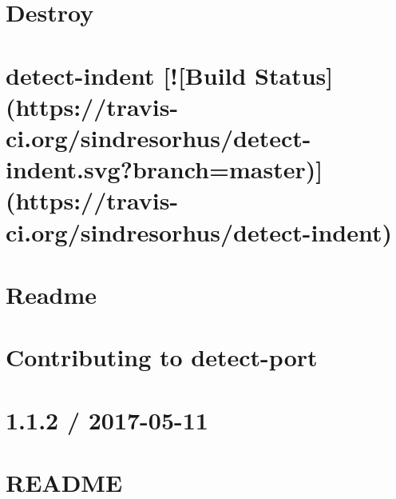 \documentclass[twoside]{book}
\newcommand{\+}{\discretionary{\mbox{\scriptsize$\hookleftarrow$}}{}{}}
\begin{document}
\chapter{Destroy}
\label{md__c_1_workspace_demo_src_main_script_node_modules_destroy__r_e_a_d_m_e}

\chapter{detect-\/indent \mbox{[}!\mbox{[}Build Status\mbox{]}(https\+://travis-\/ci.org/sindresorhus/detect-\/indent.svg?branch=master)\mbox{]}(https\+://travis-\/ci.org/sindresorhus/detect-\/indent)}
\label{md__c_1_workspace_demo_src_main_script_node_modules_detect-indent_readme}

\chapter{Readme}
\label{md__c_1_workspace_demo_src_main_script_node_modules_detect-node__readme}

\chapter{Contributing to detect-\/port}
\label{md__c_1_workspace_demo_src_main_script_node_modules_detect-port-alt__c_o_n_t_r_i_b_u_t_i_n_g}

\chapter{1.1.2 / 2017-\/05-\/11}
\label{md__c_1_workspace_demo_src_main_script_node_modules_detect-port-alt__h_i_s_t_o_r_y}

\chapter{R\+E\+A\+D\+ME}
\label{md__c_1_workspace_demo_src_main_script_node_modules_detect-port-alt__r_e_a_d_m_e}

\end{document}
